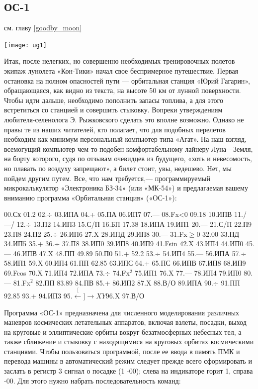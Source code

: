 \documentclass[11pt,a4paper,oneside]{article}
\def\XY{$\stackrel[\leftarrow]{\rightarrow}{XY}$}
\begin{document}
\subsection{ОС-1}
см. главу \ref{goodby_moon}

\texttt{[image: ug1]}

Итак, после нелегких, но совершенно необходимых тренировочных полетов экипаж лунолета «Кон-Тики» начал свое беспримерное путешествие. Первая остановка на полном опасностей пути — орбитальная станция «Юрий Гагарин», обращающаяся, как видно из текста, на высоте 50 км от лунной поверхности. Чтобы идти дальше, необходимо пополнить запасы топлива, а для этого встретиться со станцией и совершить стыковку. Вопреки утверждениям любителя-селенолога Э. Рыжковского сделать это вполне возможно. Однако не правы те из наших читателей, кто полагает, что для подобных перелетов необходим как минимум персональный компьютер типа «Агат». На наш взгляд, всемогущий компьютер чем-то подобен комфортабельному лайнеру Луна—Земля, на борту которого, судя по отзывам очевидцев из будущего, «хоть и невесомость, но плавать по воздуху запрещают», а билет стоит, увы, недешево. Нет, мы пойдем другим путем. Все, что нам требуется,— программируемый микрокалькулятор «Электроника БЗ-34» (или «МК-54») и предлагаемая вашему вниманию программа «Орбитальная станция» («ОС-1»):

00.Сх 01.2 02.$\div$ 03.ИПА 04.+ 05.ПА 06.ИП7 07.— 08.Fx<0 09.18 10.ИПВ 11./—/ 12.$\div$ 13.П2 14.ИП3 15.С/П
16.БП 17.38 18.ИПА 19.ИП1 20.—
21.С/П 22.П9 23.П8 24.П2 25.$\div$ 26.ИП6
27.X 28.ИПД 29.ИП8 30.— 31.Fx$\geq$0 32.00 33.ПД 34.ИП5 35.+ 36.$\div$ 37.П8
38.ИП0 39.ИП8 40.ИП9 41.Fsin
42.X 43.ИП4 44.ИП0 45.— 46.ИПВ 47.X
48.ПП 49.89 50.П0 51.+ 52.2 53.$\div$ 54.ИП4 55.— 56.ИПА 57.$\div$ 58.ИП1 59.X
60.ИП4 61.ПП 62.85 63.ИПС 64.+
65.ПС 66.ИПВ 67.ИП8 68.ИП9 69.Fcos
70.X 71.ИП4 72.ИПА 73.$\div$ 74.Fx$^{2}$
75.ИП1 76.X 77.— 78.ИП4 79.ИП0 80.— 81.Fx$^{2}$ 82.ПП 83.89 84.ПВ 85.+ 86.ИП2 87.X 88.В/О 89.ИПА 90.$\div$ 91.ПП 92.85
93.+ 94.ИП3 95.\XY 96.X 97.В/О

Программа «ОС-1» предназначена для численного моделирования различных маневров космических летательных аппаратов, включая взлеты, посадки, выход на круговые и эллиптические орбиты вокруг безатмосферных небесных тел, а также сближение и стыковку с находящимися на круговых орбитах космическими станциями. Чтобы пользоваться программой, после ее ввода в память ПМК и перевода машины в автоматический режим следует прежде всего сформировать и заслать в регистр 3 сигнал о посадке (1 -00); слева на индикаторе горит 1, справа -00. Для этого нужно набрать последовательность команд:
\end{document}
